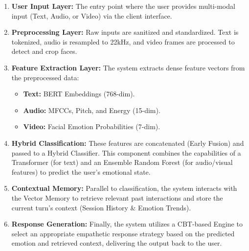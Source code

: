 \begin{enumerate}
    \item \textbf{User Input Layer:} The entry point where the user provides multi-modal input (Text, Audio, or Video) via the client interface.
    
    \item \textbf{Preprocessing Layer:} Raw inputs are sanitized and standardized. Text is tokenized, audio is resampled to 22kHz, and video frames are processed to detect and crop faces.
    
    \item \textbf{Feature Extraction Layer:} The system extracts dense feature vectors from the preprocessed data:
    \begin{itemize}
        \item \textbf{Text:} BERT Embeddings (768-dim).
        \item \textbf{Audio:} MFCCs, Pitch, and Energy (15-dim).
        \item \textbf{Video:} Facial Emotion Probabilities (7-dim).
    \end{itemize}
    
    \item \textbf{Hybrid Classification:} These features are concatenated (Early Fusion) and passed to a Hybrid Classifier. This component combines the capabilities of a Transformer (for text) and an Ensemble Random Forest (for audio/visual features) to predict the user's emotional state.
    
    \item \textbf{Contextual Memory:} Parallel to classification, the system interacts with the Vector Memory to retrieve relevant past interactions and store the current turn's context (Session History \& Emotion Trends).
    
    \item \textbf{Response Generation:} Finally, the system utilizes a CBT-based Engine to select an appropriate empathetic response strategy based on the predicted emotion and retrieved context, delivering the output back to the user.
\end{enumerate}

